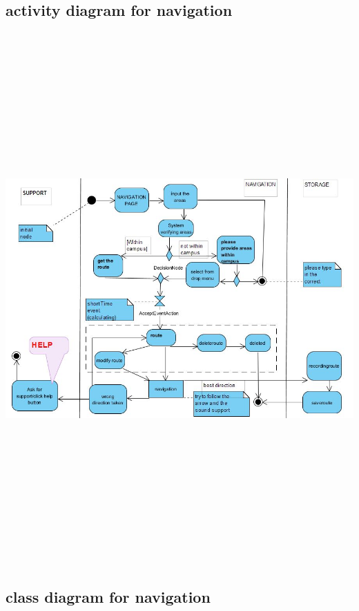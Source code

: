 \documentclass[10pt]{article}
\begin{document}
\pagebreak
\subsection{activity diagram for navigation}

\includegraphics[width=8in, height=8in]{NAD.JPG} \\

\pagebreak
\subsection{class diagram for navigation}
\end{document}
